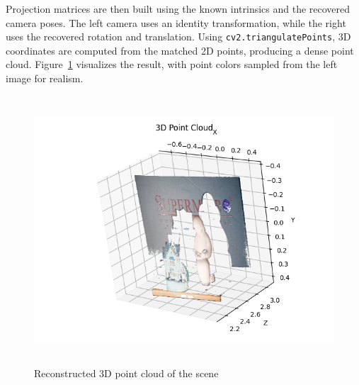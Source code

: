 \documentclass{report}
\begin{document}
Projection matrices are then built using the known intrinsics and the recovered camera poses. The left camera uses an identity transformation, while the right uses the recovered rotation and translation. Using \texttt{cv2.triangulatePoints}, 3D coordinates are computed from the matched 2D points, producing a dense point cloud. Figure~\ref{fig:cloud} visualizes the result, with point colors sampled from the left image for realism.

\begin{figure}[H]
    \centering
    \includegraphics[height=100mm, keepaspectratio]{report_images/3_point_cloud/point_cloud.png}
    \caption{Reconstructed 3D point cloud of the scene}
    \label{fig:cloud}
\end{figure}
\end{document}
